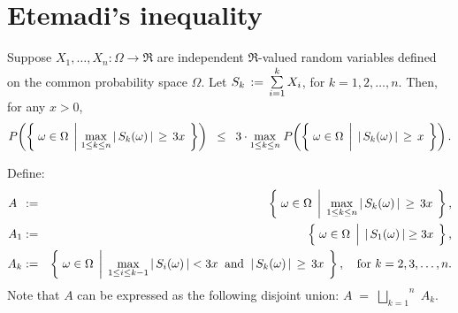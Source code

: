 

\section{Etemadi's inequality}
\setcounter{theorem}{0}
\setcounter{equation}{0}

\renewcommand{\theenumi}{\roman{enumi}}
\renewcommand{\labelenumi}{\textnormal{(\theenumi)}$\;\;$}

\begin{theorem}
\label{EtemadiInequality}
\mbox{}\vskip 0.1cm
\noindent
Suppose $X_{1}, \ldots , X_{n} : \Omega \longrightarrow \Re$ are independent
$\Re$-valued random variables defined on the common probability space $\Omega$.
Let $S_{k} \,:=\, \overset{k}{\underset{i=1}{\textnormal{\large$\sum$}}}\,X_{i}$, for $k = 1, 2, \ldots, n$.
Then, for any $x > 0$,
\begin{equation*}
P\!\left(\left\{\;
	\omega \in \Omega
	\;\left\vert\;
	\underset{1\leq k \leq n}{\max}\,\vert\,S_{k}(\omega)\,\vert \,\overset{{\color{white}:}}{\geq}\, 3x
	\right.
\;\right\}\right)
\;\; \leq \;\;
3 \cdot \underset{1\leq k \leq n}{\max}\;
P\!\left(\left\{\;
	\omega \in \Omega
	\;\left\vert\;\,
	\vert\,S_{k}(\omega)\,\vert \,\overset{{\color{white}1}}{\geq}\, x
	\right.
\;\right\}\right).
\end{equation*}
\end{theorem}
\proof
Define:
\begin{eqnarray*}
A_{{\color{white}0}} & := &
\left\{\;
	\omega \in \Omega
	\;\left\vert\;\,
	\underset{1\leq k \leq n}{\max}\,\vert\,S_{k}(\omega)\,\vert \,\overset{{\color{white}:}}{\geq}\, 3x
	\right.
\;\right\},
\\
A_{1} & := &
\left\{\;
	\omega \in \Omega
	\;\left\vert\;\,
	\vert\,S_{1}(\omega)\,\vert \overset{{\color{white}:}}{\geq} 3x
	\right.
\;\right\},
\\
A_{k} & := &
\left\{\;
	\omega \in \Omega
	\;\left\vert\;\,
	\underset{1\leq i \leq k-1}{\max}\,\vert\,S_{i}(\omega)\,\vert \overset{{\color{white}:}}{<} 3x
	\;\;\textnormal{and}\;\;
	\vert\,S_{k}(\omega)\,\vert\,\geq\,3x
	\right.
\;\right\},
\quad\textnormal{for $k = 2, 3, \ldots, n$}.
\end{eqnarray*}
Note that $A$ can be expressed as the following disjoint union:\;
$A \; = \; \overset{n}{\underset{k=1}{\bigsqcup}}\;A_{k}$.

